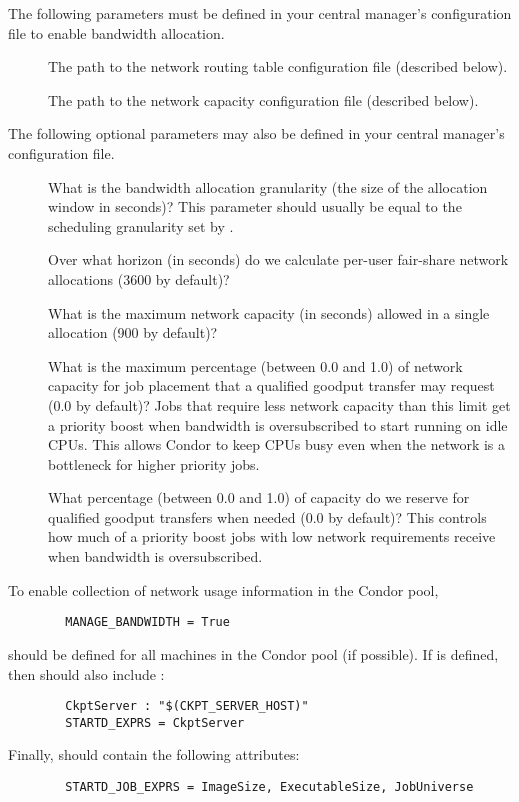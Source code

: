 The following parameters must be defined in your central manager's
configuration file to enable bandwidth allocation.
\begin{description}
\item[]
  The path to the network routing table configuration file (described
  below).
\item[]
  The path to the network capacity configuration file (described
  below).
\end{description}

The following optional parameters may also be defined in your central
manager's configuration file.
\begin{description}
\item[]
  What is the bandwidth allocation granularity (the size of the
  allocation window in seconds)?  This parameter should
  usually be equal to the scheduling granularity set by
  .
\item[]
  Over what horizon (in seconds) do we calculate per-user fair-share
  network allocations (3600 by default)?
\item[]
  What is the maximum network capacity (in seconds) allowed in a
  single allocation (900 by default)?
\item[]
  What is the maximum percentage (between 0.0 and 1.0) of network
  capacity for job placement that a qualified goodput transfer may
  request (0.0 by default)?  Jobs that require less network capacity
  than this limit get a priority boost when bandwidth is
  oversubscribed to start running on idle CPUs.  This allows Condor to
  keep CPUs busy even when the network is a bottleneck for higher
  priority jobs.
\item[]
  What percentage (between 0.0 and 1.0) of capacity do we reserve for
  qualified goodput transfers when needed (0.0 by default)?  This
  controls how much of a priority boost jobs with low network
  requirements receive when bandwidth is oversubscribed.
\end{description}

To enable collection of network usage information in the Condor pool, 
\begin{verbatim}
        MANAGE_BANDWIDTH = True
\end{verbatim}
should be defined for all machines in the Condor pool (if possible).
If  is defined, then
 should also include :
\begin{verbatim}
        CkptServer : "$(CKPT_SERVER_HOST)"
        STARTD_EXPRS = CkptServer
\end{verbatim}
Finally,  should contain the following
attributes:
\begin{verbatim}
        STARTD_JOB_EXPRS = ImageSize, ExecutableSize, JobUniverse
\end{verbatim}

